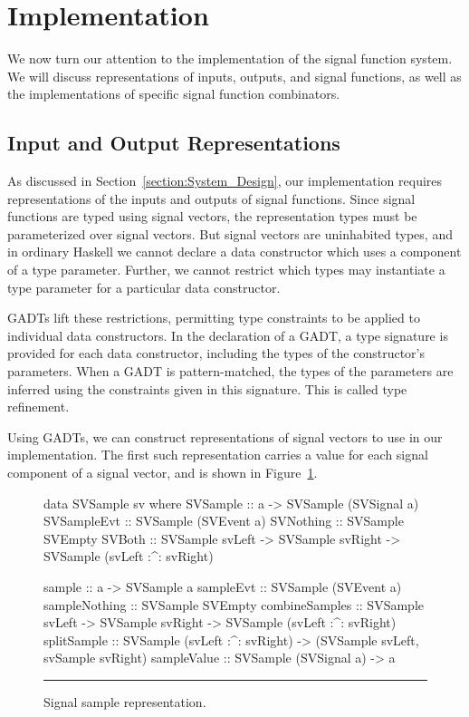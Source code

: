 \documentclass[draft]{llncs}
\begin{document}
\section{Implementation}
\label{section:Implementation}

We now turn our attention to the implementation of the signal function
system. We will discuss representations of inputs, outputs, and signal functions,
as well as the implementations of specific signal function combinators.

\subsection{Input and Output Representations}
\label{subsection:Input_and_Output_Representations}
As discussed in Section~\ref{section:System_Design}, our implementation requires
representations of the inputs and outputs of signal functions. Since signal
functions are typed using signal vectors, the representation types must be
parameterized over signal vectors. But signal vectors are uninhabited types, and
in ordinary Haskell we cannot declare a data constructor which uses a component
of a type parameter. Further, we cannot restrict which types may instantiate a
type parameter for a particular data constructor.

GADTs lift these restrictions, permitting type constraints to be applied
to individual data constructors. In the declaration of a GADT, a type signature
is provided for each data constructor, including the types of the constructor's
parameters. When a GADT is pattern-matched, the types of the parameters are
inferred using the constraints given in this signature. This is called type
refinement.

Using GADTs, we can construct representations of signal vectors to use in our
implementation. The first such representation carries a value for each signal
component of a signal vector, and is shown in Figure~\ref{figure:signal_sample_representation}.

\begin{figure}[t]
\begin{code}
data SVSample sv where
  SVSample    :: a -> SVSample (SVSignal a)
  SVSampleEvt :: SVSample (SVEvent a)
  SVNothing   :: SVSample SVEmpty
  SVBoth      :: SVSample svLeft -> SVSample svRight
                 -> SVSample (svLeft :^: svRight)

sample         :: a -> SVSample a
sampleEvt      :: SVSample (SVEvent a)
sampleNothing  :: SVSample SVEmpty
combineSamples :: SVSample svLeft -> SVSample svRight
                  -> SVSample (svLeft :^: svRight)
splitSample    :: SVSample (svLeft :^: svRight)
                  -> (SVSample svLeft, svSample svRight)
sampleValue    :: SVSample (SVSignal a) -> a
\end{code}
\hrule
\caption{Signal sample representation.}
\label{figure:signal_sample_representation}
\end{figure}
\end{document}
